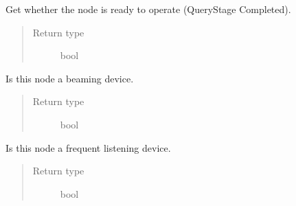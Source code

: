 \documentclass[letterpaper,10pt,english]{sphinxmanual}
\begin{document}
\begin{fulllineitems}
\begin{fulllineitems}
\end{fulllineitems}


\begin{fulllineitems}
\label{node:openzwave.node.ZWaveNode.isReady}
Get whether the node is ready to operate (QueryStage Completed).
\begin{quote}\begin{description}
\item[{Return type}] \leavevmode
bool

\end{description}\end{quote}

\end{fulllineitems}


\begin{fulllineitems}
\label{node:openzwave.node.ZWaveNode.is_beaming_device}
Is this node a beaming device.
\begin{quote}\begin{description}
\item[{Return type}] \leavevmode
bool

\end{description}\end{quote}

\end{fulllineitems}


\begin{fulllineitems}
\label{node:openzwave.node.ZWaveNode.is_frequent_listening_device}
Is this node a frequent listening device.
\begin{quote}\begin{description}
\item[{Return type}] \leavevmode
bool

\end{description}\end{quote}

\end{fulllineitems}



\end{fulllineitems}
\end{document}
